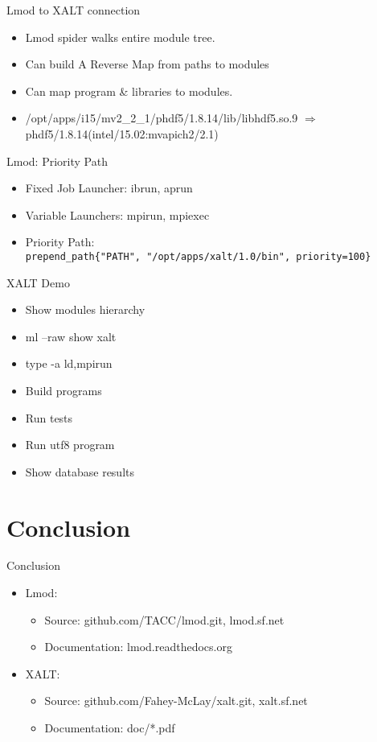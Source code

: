 \documentclass{beamer}
\begin{document}
\begin{frame}{Lmod to XALT connection}
  \begin{itemize}
    \item Lmod spider walks entire module tree.
    \item Can build A Reverse Map from paths to modules
    \item Can map program \& libraries to modules.
    \item /opt/apps/i15/mv2\_2\_1/phdf5/1.8.14/lib/libhdf5.so.9
      $\Rightarrow$ phdf5/1.8.14(intel/15.02:mvapich2/2.1)
  \end{itemize}
\end{frame}

\begin{frame}{Lmod: Priority Path}
  \begin{itemize}
    \item Fixed Job Launcher: ibrun, aprun
    \item Variable Launchers: mpirun, mpiexec
    \item Priority Path: \\
      \texttt{prepend\_path\{"PATH", "/opt/apps/xalt/1.0/bin", priority=100\}}
  \end{itemize}
\end{frame}

\begin{frame}{XALT Demo}
  \begin{itemize}
    \item Show modules hierarchy
    \item ml --raw show xalt
    \item type -a {ld,mpirun}
    \item Build programs
    \item Run tests
    \item Run utf8 program
    \item Show database results
  \end{itemize}
\end{frame}


\section{Conclusion}
\begin{frame}{Conclusion}
  \begin{itemize}
    \item Lmod:
      \begin{itemize}
        \item Source: github.com/TACC/lmod.git, lmod.sf.net
        \item Documentation: lmod.readthedocs.org
      \end{itemize}
    \item XALT:
      \begin{itemize}
        \item Source: github.com/Fahey-McLay/xalt.git, xalt.sf.net
        \item Documentation: doc/*.pdf
      \end{itemize}
  \end{itemize}
\end{frame}
\end{document}
